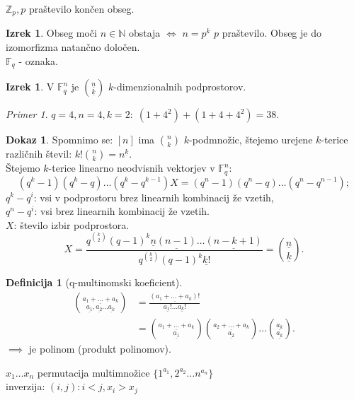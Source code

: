 \documentclass[a4paper, 12pt]{book}
\theoremstyle{definition}
\newtheorem{defn}[counter]{Definicija}
\newtheorem{theorem}[counter]{Izrek}
\newtheorem{pro}[counter]{Dokaz}
\theoremstyle{remark}
\newtheorem*{ex}{Primer}
\newcommand{\N}{\mathbb{N}}
\newcommand{\Z}{\mathbb{Z}}
\newcommand{\F}{\mathbb{F}}
\begin{document}
$\Z_p, p$ praštevilo končen obseg.
\begin{theorem}
  Obseg moči $n \in \N$ obstaja $\iff$ $n = p^k$ $p$ praštevilo.
  Obseg je do izomorfizma natančno določen. \\
  $\F_q$ - oznaka.
\end{theorem}
\begin{theorem}
  V $\F_q^n$ je $\binom{\underline{n}}{\underline{k}}$ $k$-dimenzionalnih podprostorov.
\end{theorem}
\begin{ex}
  $q=4, n=4, k=2: \; (1 + 4^2) + (1 + 4 + 4^2) = 38$.
\end{ex}
\begin{pro}
  Spomnimo se: $[n]$ ima $\binom{n}{k}$ $k$-podmnožic,
  štejemo urejene $k$-terice različnih števil: $k! \binom{n}{k} = n^{\underline{k}}$. \\
  Štejemo $k$-terice linearno neodvisnih vektorjev v $\F_q^n$:
  \begin{equation*}
    (q^k-1) (q^k-q) \dots (q^k - q^{k-1}) X = (q^n-1) (q^n-q) \dots (q^n - q^{n-1});
  \end{equation*}
  $q^k - q^i$: vsi v podprostoru brez linearnih kombinacij že vzetih, \\
  $q^n - q^i$: vsi brez linearnih kombinacij že vzetih. \\
  $X$: število izbir podprostora.
  \begin{equation*}
    X = \frac{q^{\binom{k}{2}} (q-1)^k \underline{n} \underline{(n-1)} \dots \underline{(n-k+1)}}
      {q^{\binom{k}{2}} (q-1)^k \underline{k!}} = \binom{\underline{n}}{\underline{k}}.
  \end{equation*}
\end{pro}
\begin{defn}[q-multinomski koeficient]
  \begin{align*}
    \binom{\underline{a_1 + \dots + a_k}}{\underline{a_1}, \underline{a_2} \dots \underline{a_k}}
    &= \frac{\underline{(a_1 + \dots + a_k)!}}{\underline{a_1!} \dots \underline{a_k!}} \\
    &= \binom{\underline{a_1 + \dots + a_k}}{\underline{a_1}}
      \binom{\underline{a_2 + \dots + a_k}}{\underline{a_2}} \dots \binom{\underline{a_k}}{\underline{a_k}}.
  \end{align*}
  $\implies$ je polinom (produkt polinomov).
\end{defn}
$x_1 \dots x_n$ permutacija multimnožice $\{1^{a_1}, 2^{a_2} \dots n^{a_n}\}$ \\
inverzija: $(i,j): i < j, x_i > x_j$ \\
\end{document}
